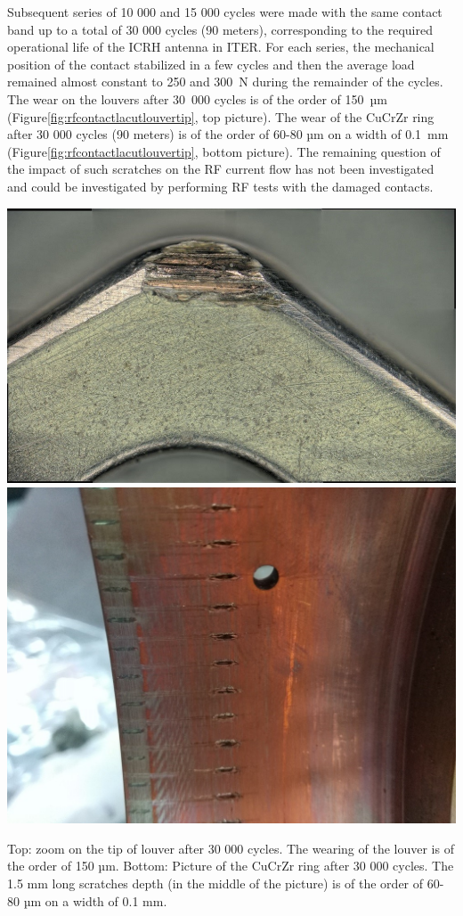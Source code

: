 {Subsequent series of 10 000 and 15 000 cycles were made with the same contact band up to a total of 30 000 cycles (90 meters), corresponding to the required operational life of the ICRH antenna in ITER. For each series, the mechanical position of the contact stabilized in a few cycles and then the average load remained almost constant to 250 and 300~N during the remainder of the cycles. The wear on the louvers after 30~000 cycles is of the order of 150~µm (Figure\ref{fig:rfcontactlacutlouvertip}, top picture). The wear of the CuCrZr ring after 30 000 cycles (90 meters) is of the order of 60-80 µm on a width of 0.1~mm (Figure\ref{fig:rfcontactlacutlouvertip}, bottom picture). The remaining question of the impact of such scratches on the RF current flow has not been investigated and could be investigated by performing RF tests with the damaged contacts.


\begin{marginfigure}
	\centering
	\includegraphics[width=1.0\linewidth]{figures/chap3/RF_contacts/RF_contact_LACUT_louvertip}\\
	\includegraphics[width=1.0\linewidth]{figures/chap3/RF_contacts/RF_contact_LACUT_scratches}
	\caption{Top: zoom on the tip of louver after 30 000 cycles. The wearing of the louver is of the order of 150 µm. Bottom: Picture of the CuCrZr ring after 30 000 cycles. The 1.5 mm long scratches depth (in the middle of the picture) is of the order of 60-80 µm on a width of 0.1 mm.}
	\label{fig:rfcontactlacutlouvertip}
\end{marginfigure}


}
